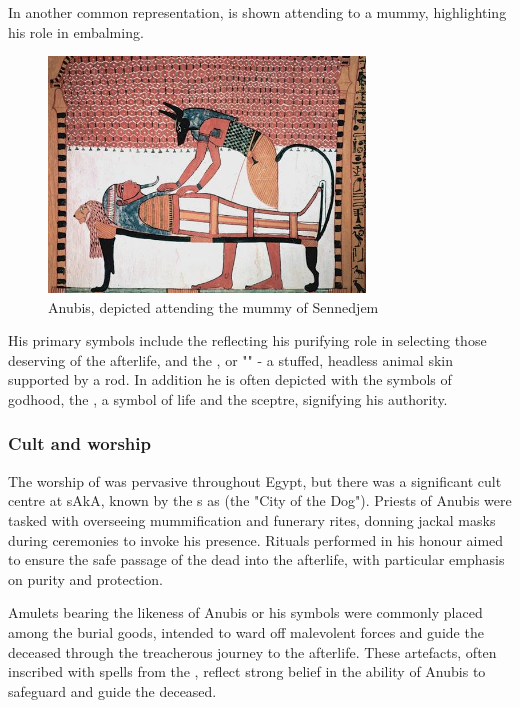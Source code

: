 In another common representation,  is shown attending to a mummy, highlighting his role in embalming.

\begin{figure} [H]
	\centering
	\includegraphics[width=0.75\textwidth]{../photos/Anubis_Sennedjem}
	\caption{Anubis, depicted attending the mummy of Sennedjem}
\end{figure}

His primary symbols include the  reflecting his purifying role in selecting those deserving of the afterlife, and the , or "" - a stuffed, headless animal skin supported by a rod. In addition he is often depicted with the symbols of godhood, the , a symbol of life and the  sceptre, signifying his authority.

\subsubsection*{Cult and worship}
The worship of  was pervasive throughout Egypt, but there was a significant cult centre at sAkA, known by the s as  (the "City of the Dog"). Priests of Anubis were tasked with overseeing mummification and funerary rites, donning jackal masks during ceremonies to invoke his presence. Rituals performed in his honour aimed to ensure the safe passage of the dead into the afterlife, with particular emphasis on purity and protection.

Amulets bearing the likeness of Anubis or his symbols were commonly placed among the burial goods, intended to ward off malevolent forces and guide the deceased through the treacherous journey to the afterlife. These artefacts, often inscribed with spells from the , reflect strong belief in the ability of Anubis to safeguard and guide the deceased.

